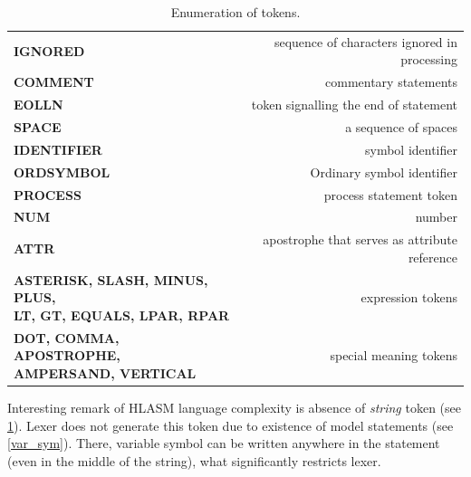 \begin{description}
	\begin{table}
		\centering
		\begin{tabular}{lr}
			\toprule
			\textbf{IGNORED}                                                                     &  sequence of characters ignored in processing \\
			\textbf{COMMENT}                                                                     &                         commentary statements \\
			\textbf{EOLLN}                                                                       &         token signalling the end of statement \\
			\textbf{SPACE}                                                                       &                          a sequence of spaces \\
			\textbf{IDENTIFIER}                                                                  &                             symbol identifier \\
			\textbf{ORDSYMBOL}                                                                   &                    Ordinary symbol identifier \\
			\textbf{PROCESS}                                                                     &                       process statement token \\
			\textbf{NUM}                                                                         &                                        number \\
			\textbf{ATTR}                                                                        & apostrophe that serves as attribute reference \\
			\thead{\textbf{ASTERISK, SLASH, MINUS, PLUS,}\\ \textbf{LT, GT, EQUALS, LPAR, RPAR}} &                             expression tokens \\
			\thead{\textbf{DOT, COMMA, APOSTROPHE,}\\ \textbf{AMPERSAND, VERTICAL}}              &                        special meaning tokens \\ \bottomrule
		\end{tabular}
		\caption{Enumeration of tokens.}
		\label{tab06:tokens}
	\end{table}
	
	Interesting remark of HLASM language complexity is absence of \emph{string} token (see \cref{tab06:tokens}). Lexer does not generate this token due to existence of model statements (see \cref{var_sym}). There, variable symbol can be written anywhere in the statement (even in the middle of the string), what significantly restricts lexer.
	

\end{description}
